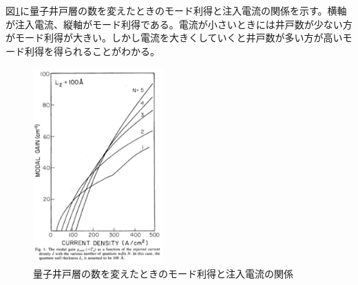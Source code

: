 図\ref{fig:fig_gain_mode}に量子井戸層の数を変えたときのモード利得と注入電流の関係を示す\cite{y_arakawa}。横軸が注入電流、縦軸がモード利得である。電流が小さいときには井戸数が少ない方がモード利得が大きい。しかし電流を大きくしていくと井戸数が多い方が高いモード利得を得られることがわかる。
\begin{figure}[h]
	\centering
	\includegraphics[width=5cm]{figure/fig_1_1_gain_mode.png}
	\caption{量子井戸層の数を変えたときのモード利得と注入電流の関係}
	\label{fig:fig_gain_mode}
\end{figure}





